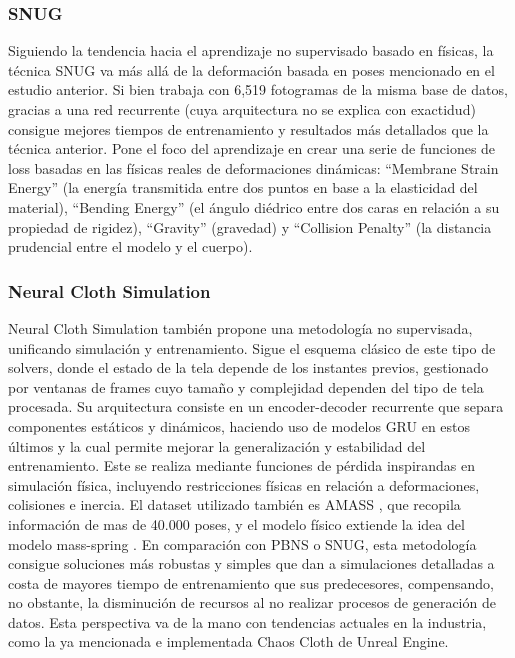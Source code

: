 \subsubsection{SNUG}
Siguiendo la tendencia hacia el aprendizaje no supervisado basado en físicas, la técnica SNUG \cite{santesteban2022snug} va más allá de la deformación basada en poses mencionado en el estudio anterior. Si bien trabaja con 6,519 fotogramas de la misma base de datos, gracias a una red recurrente (cuya arquitectura no se explica con exactidud) consigue mejores tiempos de entrenamiento y resultados más detallados que la técnica anterior. Pone el foco del aprendizaje en crear una serie de funciones de loss basadas en las físicas reales de deformaciones dinámicas: ``Membrane Strain Energy'' (la energía transmitida entre dos puntos en base a la elasticidad del material), ``Bending Energy'' (el ángulo diédrico entre dos caras en relación a su propiedad de rigidez), ``Gravity'' (gravedad) y ``Collision Penalty'' (la distancia prudencial entre el modelo y el cuerpo).

\subsubsection{Neural Cloth Simulation} 
Neural Cloth Simulation \cite{bertiche2022neural} también propone una metodología no supervisada, unificando simulación y entrenamiento. Sigue el esquema clásico de este tipo de solvers, donde el estado de la tela depende de los instantes previos, gestionado por ventanas de frames cuyo tamaño y complejidad dependen del tipo de tela procesada. Su arquitectura consiste en un encoder-decoder recurrente que separa componentes estáticos y dinámicos, haciendo uso de modelos GRU en estos últimos y la cual permite mejorar la generalización y estabilidad del entrenamiento. Este se realiza mediante funciones de pérdida inspirandas en simulación física, incluyendo restricciones físicas en relación a deformaciones, colisiones e inercia. El dataset utilizado también es AMASS \cite{mahmood2019AMASS}, que recopila información de mas de 40.000 poses, y el modelo físico extiende la idea del modelo mass-spring \cite{provot1995deformation}. En comparación con PBNS o SNUG, esta metodología consigue soluciones más robustas y simples que dan a simulaciones detalladas a costa de mayores tiempo de entrenamiento que sus predecesores, compensando, no obstante, la disminución de recursos al no realizar procesos de generación de datos. Esta perspectiva va de la mano con tendencias actuales en la industria, como la ya mencionada e implementada Chaos Cloth de Unreal Engine.

